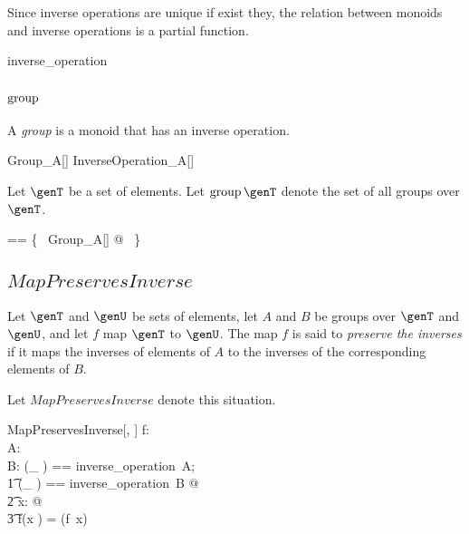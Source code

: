\documentclass{amsart}
\begin{document}
\begin{remark}
Since inverse operations are unique if exist they, the relation between monoids and inverse operations
is a partial function.

\begin{zed}
inverse\_operation \in \monoid \setT \pfun \setT \pfun \setT
\end{zed}

\end{remark}

\subsection{$\operatorname{group}$}

A {\em group} is a monoid that has an inverse operation.
\begin{schema}{Group\_A}[\genT]
	InverseOperation\_A[\genT]
\end{schema}

Let $\genT$ be a set of elements.
Let $\group \genT$ denote the set of all groups over $\genT$.
\begin{zed}
	\group \genT == \{~ Group\_A[\genT] @ \strucA ~\}
\end{zed}

\subsection{$MapPreservesInverse$}

Let $\genT$ and $\genU$ be sets of elements,
let $A$ and $B$ be groups over $\genT$ and $\genU$, 
and let $f$ map $\genT$ to $\genU$.
The map $f$ is said to {\em preserve the inverses} if it maps the inverses of elements of $A$
to the inverses of the corresponding elements of $B$.

Let $MapPreservesInverse$ denote this situation.

\begin{schema}{MapPreservesInverse}[\genT, \genU]
f: \genT \pfun \genU \\
A: \group \genT \\
B: \group \genU
\where
\LET (\_ \invG) == inverse\_operation~A; \\
\t1	(\_ \daggerG) == inverse\_operation~B @ \\
\t2		\forall x: \genT @ \\
\t3			f(x \invG) = (f~x) \daggerG
\end{schema}

\subsection{}
\end{document}
